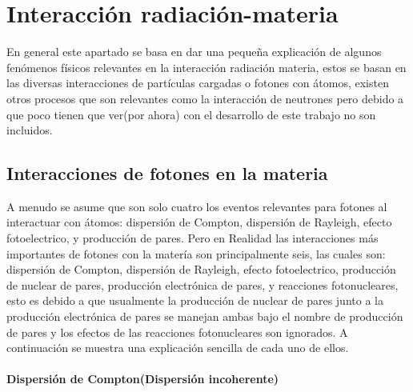 
\clearpage

\section{Interacción radiación-materia}
\label{sec:Intro}
En general este apartado se basa en dar una pequeña explicación de algunos fenómenos físicos relevantes en la interacción radiación materia, estos se basan en las diversas interacciones de partículas cargadas o fotones con átomos, existen otros procesos que son relevantes como la interacción de neutrones pero debido a que poco tienen que ver(por ahora) con el desarrollo de este trabajo no son incluidos.
\subsection{Interacciones de fotones en la materia}
 A menudo se asume que son solo cuatro los eventos relevantes para fotones al interactuar con átomos: dispersión de Compton, dispersión de Rayleigh, efecto fotoelectrico, y producción de pares.
Pero en Realidad las interacciones más importantes de fotones con la matería son principalmente seis, las cuales son: dispersión de Compton, dispersión de Rayleigh, efecto fotoelectrico, producción de nuclear de pares, producción electrónica de pares, y reacciones fotonucleares, esto es debido a que usualmente la producción de nuclear de pares junto a la producción electrónica de pares se manejan ambas bajo el nombre de producción de pares y los efectos de las reacciones fotonucleares son ignorados. A continuación se muestra una explicación sencilla de cada uno de ellos.

\paragraph{Dispersión de Compton(Dispersión incoherente)}

